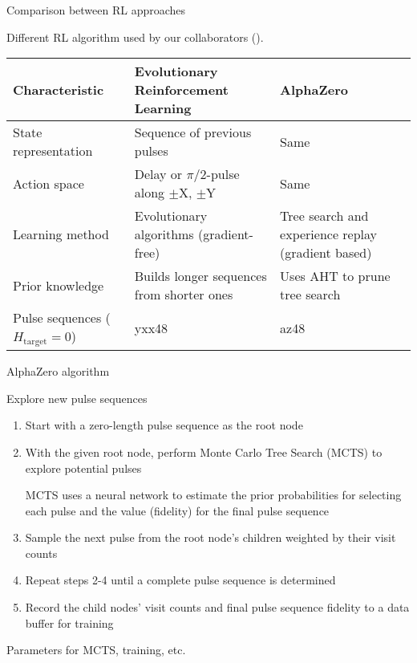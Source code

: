 \documentclass{beamer}
\begin{document}
\begin{frame}{Comparison between RL approaches}

Different RL algorithm used by our collaborators (\cite{peng2021deep}).

\begin{table}
\centering
\begin{footnotesize}
\begin{tabular}{p{}|p{}|p{}}
    Characteristic & Evolutionary Reinforcement Learning & AlphaZero \\
    \hline
    State representation & Sequence of previous pulses & Same \\
    \hline
    Action space & Delay or $\pi/2$-pulse along $\pm$X, $\pm$Y & Same \\
    \hline
    Learning method & Evolutionary algorithms (gradient-free) & Tree search and experience replay (gradient based) \\
    \hline
    Prior knowledge & Builds longer sequences from shorter ones & Uses AHT to prune tree search \\
    \hline
    Pulse sequences ($H_\text{target} = 0$) & yxx48 & az48
\end{tabular}
\end{footnotesize}
\end{table}

\end{frame}



\begin{frame}{AlphaZero algorithm}


Explore new pulse sequences

\begin{enumerate}

\item
Start with a zero-length pulse sequence as the root node
\item
With the given root node, perform Monte Carlo Tree Search (MCTS) to
explore potential pulses

MCTS uses a neural network to estimate the prior probabilities for
selecting each pulse and the value (fidelity) for the final pulse
sequence

\item
Sample the next pulse from the root node's children weighted by
their visit counts
\item
Repeat steps 2-4 until a complete pulse sequence is determined
\item
Record the child nodes' visit counts and final pulse sequence
fidelity to a data buffer for training
\end{enumerate}

Parameters for MCTS, training, etc.
\end{frame}
\end{document}
